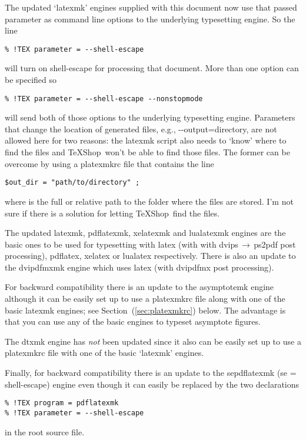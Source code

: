 \documentclass[11pt]{article}
\newcommand{\cmd}[1]{\textsf{#1}}
\newcommand{\To}{\,\(\to\)\,}
\newcommand{\TS}{\textsf{\TeX Shop}}
\begin{document}
The updated `\cmd{latexmk}' engines supplied with this document now use that passed parameter as command line options to the underlying typesetting engine. So the line
\begin{verbatim}
% !TEX parameter = --shell-escape
\end{verbatim}
will turn on shell-escape for processing that document. More than one option can be specified so
\begin{verbatim}
% !TEX parameter = --shell-escape --nonstopmode
\end{verbatim}
will send both of those options to the underlying typesetting engine. Parameters that change the location of generated files, e.g., \cmd{-{}-output=directory}, are not allowed here for two reasons: the \cmd{latexmk} script also needs to `know' where to find the files and \TS\ won't be able to find those files. The former can be overcome by using a \cmd{platexmkrc file} that contains the line
\begin{verbatim}
$out_dir = "path/to/directory" ;
\end{verbatim}
where  is the full or relative path to the folder where the files are stored. I'm not sure if there is a solution for letting \TS\ find the files.

The updated \cmd{latexmk}, \cmd{pdflatexmk}, \cmd{xelatexmk} and \cmd{lualatexmk} engines are the basic ones to be used for typesetting with \cmd{latex} (with with \cmd{dvips}\To\cmd{ps2pdf} post processing), \cmd{pdflatex}, \cmd{xelatex} or \cmd{lualatex} respectively. There is also an update to the \cmd{dvipdfmxmk} engine which uses \cmd{latex} (with \cmd{dvipdfmx} post processing).

For backward compatibility there is an update to the \cmd{asymptotemk} engine although it can be easily set up to use a \cmd{platexmkrc} file along with one of the basic \cmd{latexmk} engines; see Section~(\ref{sec:platexmkrc}) below. The advantage is that you can use any of the basic engines to typeset \cmd{asymptote} figures.

The \cmd{dtxmk} engine has \emph{not} been updated since it also can be easily set up to use a \cmd{platexmkrc} file with one of the basic `latexmk' engines.

Finally, for backward compatibility there is an update to the \cmd{sepdflatexmk} (se = shell-escape) engine even though it can easily be replaced by the two declarations
\begin{verbatim}
% !TEX program = pdflatexmk
% !TEX parameter = --shell-escape
\end{verbatim}
in the root source file.
\end{document}
